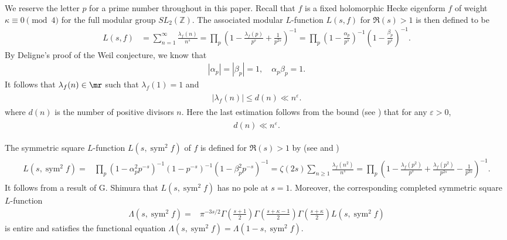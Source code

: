 \documentclass[twoside,leqno,10pt, A4]{amsart}
\begin{document}
    We reserve the letter $p$ for a prime number throughout in this paper.  Recall that $f$ is a fixed holomorphic Hecke eigenform $f$ of weight $\kappa \equiv 0 \pmod 4$ for the full modular group $SL_2 (\mathbb{Z})$. The associated modular $L$-function $L(s, f)$ for $\Re(s)>1$ is then defined to be
\begin{align}
\label{Lphichi}
L(s, f ) &= \sum_{n=1}^{\infty} \frac{\lambda_f(n)}{n^s}
 = \prod_{p} \left(1 - \frac{\lambda_f (p)}{p^s}  + \frac{1}{p^{2s}}\right)^{-1}=\prod_{p} \left(1 - \frac{\alpha_p }{p^s} \right)^{-1}\left(1 - \frac{\beta_p }{p^s} \right)^{-1}.
\end{align}
 By Deligne's proof \cite{D} of the Weil conjecture, we know that
\begin{align*}
|\alpha_{p}|=|\beta_{p}|=1, \quad \alpha_{p}\beta_{p}=1.
\end{align*}
  It follows that $\lambda_f(n) \in \mr$ such that $\lambda_f (1) =1$ and
\begin{align}
\label{lambdabound}
\begin{split}
  |\lambda_f(n)| \leq d(n) \ll n^{\varepsilon}.
\end{split}
\end{align}
 where $d(n)$ is the number of positive divisors $n$. Here the last estimation follows from the bound (see \cite[Theorem 2.11]{MVa1}) that for any $\varepsilon>0$,
\begin{align}
\label{divisorbound}
\begin{split}
  d(n) \ll n^{\varepsilon}.
\end{split}
\end{align}

     The symmetric square $L$-function $L(s, \operatorname{sym}^2 f)$ of $f$ is defined for $\Re(s)>1$ by
 (see \cite[p. 137]{iwakow} and \cite[(25.73)]{iwakow})
\begin{align*}
\begin{split}
 L(s, \operatorname{sym}^2 f)=& \prod_p(1-\alpha^2_pp^{-s})^{-1}(1-p^{-s})^{-1}(1-\beta^2_pp^{-s})^{-1} = \zeta(2s) \sum_{n \geq 1}\frac {\lambda_f(n^2)}{n^s}=\prod_{p}(1-\frac {\lambda_f(p^2)}{p^s}+\frac {\lambda_f(p^2)}{p^{2s}}-\frac {1}{p^{3s}} )^{-1}.
\end{split}
\end{align*}
  It follows from a result of G. Shimura \cite{Shimura} that $L(s, \operatorname{sym}^2 f)$ has no pole at $s=1$. Moreover, the corresponding completed symmetric square $L$-function
\begin{align}
\label{SymsquareLfeqn}
 \Lambda(s, \operatorname{sym}^2 f)=& \pi^{-3s/2}\Gamma (\frac {s+1}{2})\Gamma (\frac {s+\kappa-1}{2}) \Gamma (\frac {s+\kappa}{2}) L(s, \operatorname{sym}^2 f)
\end{align}
  is entire and satisfies the functional equation
$\Lambda(s, \operatorname{sym}^2 f)=\Lambda(1-s, \operatorname{sym}^2 f)$.
\end{document}
